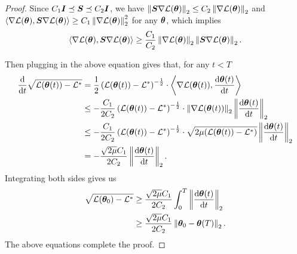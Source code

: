 \begin{proof}
    Since $C_1{\bm{I}} \preceq {\bm{S}} \preceq C_2{\bm{I}}$, we have $\left\|{\bm{S}} \nabla\mathcal{L}({\bm{\theta}})\right\|_2 \leq C_2 \left\|\nabla\mathcal{L}({\bm{\theta}})\right\|_2$ and $
        \left\langle \nabla \mathcal{L}({\bm{\theta}}), {\bm{S}}\nabla \mathcal{L}({\bm{\theta}}) \right\rangle \geq C_1 \left\|\nabla\mathcal{L}({\bm{\theta}})\right\|_2^2$
    for any ${\bm{\theta}}$, which implies \begin{align*}
        \left\langle \nabla \mathcal{L}({\bm{\theta}}), {\bm{S}}\nabla \mathcal{L}({\bm{\theta}}) \right\rangle \geq \frac{C_1}{C_2} \left\|\nabla\mathcal{L}({\bm{\theta}})\right\|_2  \left\|{\bm{S}} \nabla\mathcal{L}({\bm{\theta}})\right\|_2.
    \end{align*}
    
    Then plugging in the above equation gives that, for any $t < T$
    \begin{align*}
        \frac{\mathrm{d} }{\mathrm{d} t}\sqrt{\mathcal{L}({\bm{\theta}}(t)) - \mathcal{L}^*} &= \frac{1}{2}\left(\mathcal{L}({\bm{\theta}}(t)) - \mathcal{L}^*\right)^{-\frac{1}{2}} \cdot \left\langle \nabla \mathcal{L}({\bm{\theta}}(t)), \frac{\mathrm{d}{\bm{\theta}}(t)}{\mathrm{d} t}\right\rangle \\
        & \leq -\frac{C_1}{2C_2}\left(\mathcal{L}({\bm{\theta}}(t)) - \mathcal{L}^*\right)^{-\frac{1}{2}}\cdot  \left\|\nabla\mathcal{L}({\bm{\theta}}(t))\right\|_2 \left\|\frac{\mathrm{d} {\bm{\theta}}(t)}{\mathrm{d} t}\right\|_2 \\
        & \leq -\frac{C_1}{2C_2}\left(\mathcal{L}({\bm{\theta}}(t)) - \mathcal{L}^*\right)^{-\frac{1}{2}}\cdot \sqrt{2\mu (\mathcal{L}({\bm{\theta}}(t)) - \mathcal{L}^*)} \left\|\frac{\mathrm{d} {\bm{\theta}}(t)}{\mathrm{d} t}\right\|_2 \\
        & = -\frac{\sqrt{2\mu}C_1}{2C_2} \left\|\frac{\mathrm{d} {\bm{\theta}}(t)}{\mathrm{d} t}\right\|_2.
    \end{align*}
    Integrating both sides gives us \begin{align*}
        \sqrt{\mathcal{L}({\bm{\theta}}_0) - \mathcal{L}^*} &\geq \frac{\sqrt{2\mu}C_1}{2C_2} \int_{0}^{T}\left\|\frac{\mathrm{d} {\bm{\theta}}(t)}{\mathrm{d} t}\right\|_2 \\
        & \geq \frac{\sqrt{2\mu}C_1}{2C_2} \left\|{\bm{\theta}}_0 - {\bm{\theta}}(T)\right\|_2.
    \end{align*}
    The above equations complete the proof.
\end{proof}

